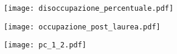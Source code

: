 \texttt{[image: disoccupazione\_percentuale.pdf]}


\texttt{[image: occupazione\_post\_laurea.pdf]}


\texttt{[image: pc\_1\_2.pdf]}